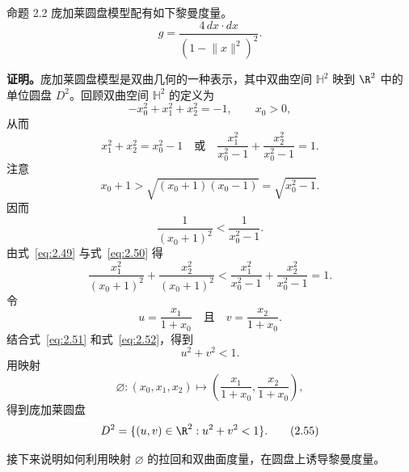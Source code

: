\begin{statement}{命题 2.2}{}
庞加莱圆盘模型配有如下黎曼度量。
\begin{equation*}
  g=\frac{4\,dx\cdot dx}{(1-\lVert x\rVert^2)^2}.
  \tag{2.47}\label{eq:2.47}
\end{equation*}

\textbf{证明。}庞加莱圆盘模型是双曲几何的一种表示，其中双曲空间 $\mathbb H^2$ 映到 $\R^2$ 中的单位圆盘 $D^2$。回顾双曲空间 $\mathbb H^2$ 的定义为
\begin{equation*}
  -x_0^2+x_1^2+x_2^2=-1,\qquad x_0>0,
  \tag{2.48}\label{eq:2.48}
\end{equation*}
从而
\begin{equation*}
  x_1^2+x_2^2=x_0^2-1
  \quad\text{或}\quad
  \frac{x_1^2}{x_0^2-1}+\frac{x_2^2}{x_0^2-1}=1.
  \tag{2.49}\label{eq:2.49}
\end{equation*}
注意
\[
  x_0+1>\sqrt{(x_0+1)(x_0-1)}=\sqrt{x_0^2-1}.
\]
因而
\begin{equation*}
  \frac{1}{(x_0+1)^2}<\frac{1}{x_0^2-1}.
  \tag{2.50}\label{eq:2.50}
\end{equation*}
由式~\eqref{eq:2.49} 与式~\eqref{eq:2.50} 得
\begin{equation*}
  \frac{x_1^2}{(x_0+1)^2}+\frac{x_2^2}{(x_0+1)^2}
  <\frac{x_1^2}{x_0^2-1}+\frac{x_2^2}{x_0^2-1}=1.
  \tag{2.51}\label{eq:2.51}
\end{equation*}
令
\begin{equation*}
  u=\frac{x_1}{1+x_0}\quad\text{且}\quad v=\frac{x_2}{1+x_0}.
  \tag{2.52}\label{eq:2.52}
\end{equation*}
结合式~\eqref{eq:2.51} 和式~\eqref{eq:2.52}，得到
\begin{equation*}
  u^2+v^2<1.
  \tag{2.53}\label{eq:2.53}
\end{equation*}
用映射
\begin{equation*}
  \varnothing\colon(x_0,x_1,x_2)\longmapsto
  \left(\frac{x_1}{1+x_0},\frac{x_2}{1+x_0}\right),
  \tag{2.54}\label{eq:2.54}
\end{equation*}
得到庞加莱圆盘
\begin{equation*}
  D^2=\{(u,v)\in\R^2:u^2+v^2<1\}.
  \tag{2.55}\label{eq:2.55}
\end{equation*}

接下来说明如何利用映射 $\varnothing$ 的拉回和双曲面度量，在圆盘上诱导黎曼度量。


\end{statement}
